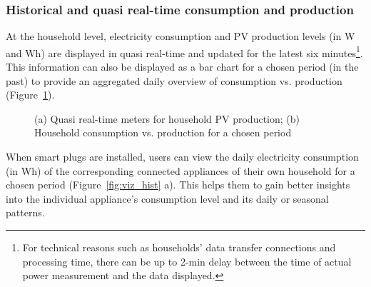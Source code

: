 
\subsubsection{Historical and quasi real-time consumption and production} 

At the household level, electricity consumption and PV production levels (in W and Wh) are displayed in quasi real-time and updated for the latest six minutes\footnote{For technical reasons such as households' data transfer connections and processing time, there can be up to 2-min delay between the time of actual power measurement and the data displayed.}.
This information can also be displayed as a bar chart for a chosen period (in the past) to provide an aggregated daily overview of consumption vs. production (Figure~\ref{fig:viz_rt}). 
% 
\begin{figure}
      \begin{center}
        \begin{minipage}[htb]{0.4\linewidth}    
        \end{minipage}
 	\hfill 
         \begin{minipage}[htb]{0.58\linewidth}    
                \end{minipage}
      \end{center}
    \caption{(a) Quasi real-time meters for household PV production; (b) Household consumption vs. production for a chosen period
}
\label{fig:viz_rt}
\end{figure}
%
When smart plugs are installed, users can view the daily electricity consumption (in Wh) of the corresponding connected appliances of their own household for a chosen period (Figure~\ref{fig:viz_hist} a). This helps them to gain better insights into the individual appliance's consumption level and its daily or seasonal patterns. 
